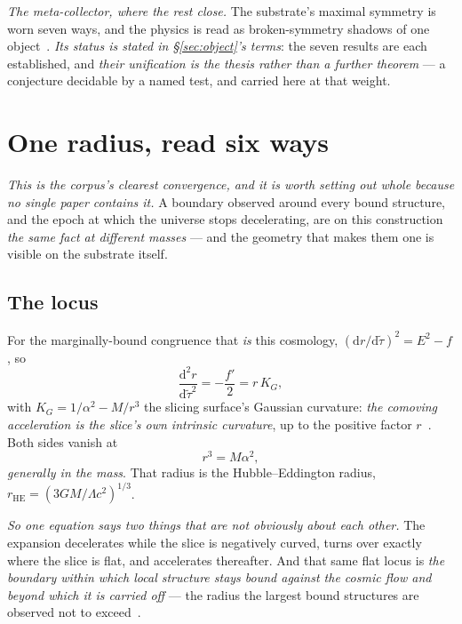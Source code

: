 \documentclass[11pt,a4paper]{article}
\newcommand{\dd}{\mathrm{d}}
\theoremstyle{plain}
\theoremstyle{definition}
\begin{document}
\emph{The meta-collector, where the rest close.} The substrate's maximal symmetry is worn seven ways, and the
physics is read as broken-symmetry shadows of one object~\cite{JanzenGeometricCore}. \emph{Its status is
stated in \S\ref{sec:object}'s terms}: the seven results are each established, and \emph{their unification is
the thesis rather than a further theorem} --- a conjecture decidable by a named test, and carried here at
that weight.



\section{One radius, read six ways}\label{sec:oneradius}

\emph{This is the corpus's clearest convergence, and it is worth setting out whole because no single paper
contains it.} A boundary observed around every bound structure, and the epoch at which the universe stops
decelerating, are on this construction \emph{the same fact at different masses} --- and the geometry that
makes them one is visible on the substrate itself.

\subsection{The locus}

For the marginally-bound congruence that \emph{is} this cosmology, $(\dd r/\dd\tilde\tau)^{2}=E^{2}-f$, so
\begin{equation}
\frac{\dd^{2}r}{\dd\tilde\tau^{2}} = -\frac{f'}{2} = r\,K_{G},
\label{eq:accel-curv}
\end{equation}
with $K_{G}=1/\alpha^{2}-M/r^{3}$ the slicing surface's Gaussian curvature: \emph{the comoving acceleration is
the slice's own intrinsic curvature}, up to the positive factor $r$~\cite{JanzenSlicing, JanzenCRframework}.
Both sides vanish at
\begin{equation}
r^{3} = M\alpha^{2},
\label{eq:radius}
\end{equation}
\emph{generally in the mass}. That radius is the Hubble--Eddington radius, $r_{\mathrm{HE}} = (3GM/\Lambda
c^{2})^{1/3}$.

\emph{So one equation says two things that are not obviously about each other.} The expansion decelerates
while the slice is negatively curved, turns over exactly where the slice is flat, and accelerates thereafter.
And that same flat locus is \emph{the boundary within which local structure stays bound against the cosmic
flow and beyond which it is carried off} --- the radius the largest bound structures are observed not to
exceed~\cite{JanzenCRcosmology}.
\end{document}
